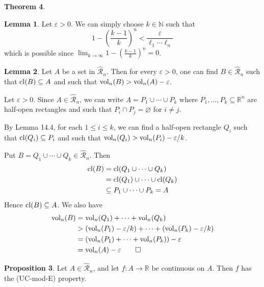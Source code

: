 \documentclass[11pt]{article}
\makeatletter
\theoremstyle{definition}
\newtheorem{thm}{Theorem}[section]
\newtheorem{prop}[thm]{Proposition}
\newtheorem{lemma}[thm]{Lemma}
\newcommand{\N}{\ensuremath{\mathbb{N}}}
\newcommand{\R}{\ensuremath{\mathbb{R}}}
\newenvironment{pf}[1][\proofname]{\par
  \pushQED{\qed}%
  \normalfont \topsep0\p@\relax
  \trivlist
  \item[\hskip\labelsep\itshape
  #1\@addpunct{.}]\ignorespaces
}{%
  \popQED\endtrivlist\@endpefalse
}
\makeatother
\begin{document}
\begin{thm}
\begin{lemma}
\begin{pf}
Let $\varepsilon > 0$. We can simply choose $k \in \N$ such that
$$1 - \left( \frac{k-1}k \right)^n < \frac{\varepsilon}{\ell_1 \cdots \ell_n}$$
which is possible since $\lim_{k\to\infty} 1 - (\frac{k-1}k)^n = 0$.
\end{pf}
\end{lemma}

\begin{lemma}
Let $A$ be a set in $\widehat{\mathcal{R}}_n$. Then for every $\varepsilon > 0$, one can find $B \in \widehat{\mathcal{R}}_n$ such that ${\rm cl}(B) \subseteq A$ and such that ${\rm vol}_n(B) > {\rm vol}_n(A) - \varepsilon$. 
\begin{pf}
Let $\varepsilon > 0$. Since $A \in \widehat{\mathcal{R}}_n$, we can write $A = P_1 \cup \cdots \cup P_k$ where $P_1, \dots, P_k \subseteq \R^n$ are half-open rectangles and such that $P_i \cap P_j = \varnothing$ for $i \neq j$. 

By Lemma 14.4, for each $1 \leq i \leq k$, we can find a half-open rectangle $Q_i$ such that ${\rm cl}(Q_i) \subseteq P_i$ and such that ${\rm vol}_n(Q_i) > {\rm vol}_n(P_i) - \varepsilon / k$. 

Put $B = Q_1 \cup \cdots \cup Q_k \in \widehat{\mathcal{R}}_n$. Then
\begin{align*}
{\rm cl}(B) &= {\rm cl}(Q_1 \cup \cdots \cup Q_k) \\
&= {\rm cl}(Q_1) \cup \cdots \cup {\rm cl}(Q_k) \\
&\subseteq P_1 \cup \cdots \cup P_k = A
\end{align*}
Hence ${\rm cl}(B) \subseteq A$. We also have
\begin{align*}
{\rm vol}_n(B) &= {\rm vol}_n(Q_1) + \cdots + {\rm vol}_n(Q_k) \\
&> ({\rm vol}_n(P_1) - \varepsilon/k) + \cdots + ({\rm vol}_n(P_k) - \varepsilon/k) \\
&= ({\rm vol}_n(P_1) + \cdots + {\rm vol}_n(P_k)) - \varepsilon \\
&= {\rm vol}_n(A) - \varepsilon \qedhere
\end{align*}
\end{pf}
\end{lemma}

\begin{prop}
Let $A \in \widehat{\mathcal{R}}_n$, and let $f : A \to \R$ be continuous on $A$. Then $f$ has the (UC-mod-E) property.


\end{prop}
\end{thm}
\end{document}
